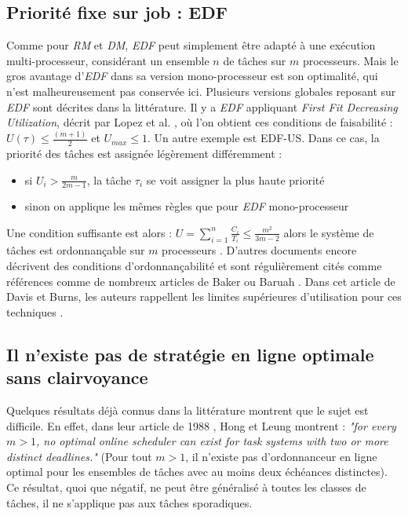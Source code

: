 \documentclass[11pt,a4paper,oneside]{report}
\begin{document}
	\subsection{Priorité fixe sur job : EDF}
	Comme pour \textit{RM} et \textit{DM}, \textit{EDF} peut simplement être adapté à une exécution multi-processeur, 
	considérant un ensemble $n$ de tâches sur $m$ processeurs. Mais le gros avantage d'\textit{EDF} 
	dans sa version mono-processeur est son optimalité, qui n'est malheureusement pas conservée ici. 
	Plusieurs versions globales reposant sur \textit{EDF} sont décrites dans la littérature. 
	Il y a \textit{EDF} appliquant \textit{First Fit Decreasing Utilization}, décrit par 
	Lopez et al. \cite{lopez_utilization_2004}, où l'on obtient ces conditions de faisabilité : \medskip
	$U(\tau) \leq \frac{(m + 1)}{2}$ et $U_{max} \leq 1$. \medskip
	Un autre exemple est EDF-US. 
	Dans ce cas, la priorité des tâches est assignée légèrement différemment :\medskip
	\begin{itemize}
		\item si $U_i > \frac{m}{2m-1}$, la tâche $\tau_i$ se voit assigner la plus haute priorité
		\item sinon on applique les mêmes règles que pour \textit{EDF} mono-processeur
	\end{itemize}
	Une condition suffisante est alors :\medskip
	$U = \sum_{i=1}^{n}\frac{C_i}{T_i} \leq \frac{m^2}{3m-2}$
	alors le système de tâches est ordonnançable sur $m$ processeurs
	\cite{andersson_static-priority_2001}. \medskip
	D'autres documents encore décrivent des conditions d'ordonnançabilité et sont régulièrement 
	cités comme références comme de nombreux articles de Baker 
	\cite{baker_multiprocessor_2003} \cite{baker_analysis_2005} ou Baruah \cite{baruah_optimal_2004}
	\cite{baruah_schedulability_2008}. 
	Dans cet article de Davis et Burns, les auteurs rappellent les 
	limites supérieures d'utilisation pour ces techniques \cite{davis_survey_2011}.\medskip
	
	
	\subsection{Il n'existe pas de stratégie en ligne optimale sans clairvoyance}
	Quelques résultats déjà connus dans la littérature montrent que le sujet est difficile. 
	En effet, dans leur article de 1988 \cite{hong_-line_1988}, Hong et Leung montrent :\medskip
	\textit{"for every $m > 1$, no optimal online scheduler can exist for task systems with two or more distinct
		deadlines."} (Pour tout $m > 1$, il n'existe pas d'ordonnanceur en ligne 
	optimal pour les ensembles de tâches avec au moins deux échéances distinctes). 
	Ce résultat, quoi que négatif, ne peut être généralisé à toutes les classes de tâches, il ne s'applique 
	pas aux tâches sporadiques. 
	
\end{document}
